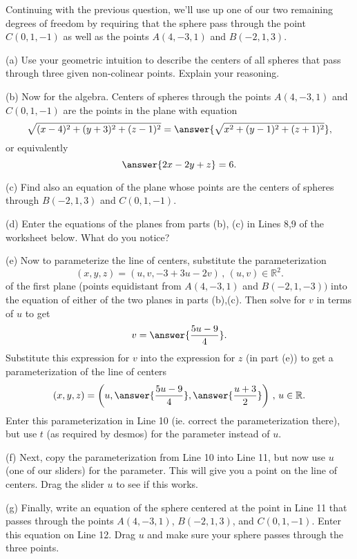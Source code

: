 \documentclass{ximera}
\begin{document}
\begin{question} \label{Q:LKdf44g44tr4}
Continuing with the previous question, we'll use up one of our two remaining degrees of freedom by requiring that the sphere pass through the point $C(0,1,-1)$ as well as the points $A(4,-3,1)$ and $B(-2,1,3)$.

\begin{freeResponse}
(a) Use your geometric intuition to describe the centers of all spheres that pass through three given non-colinear points. Explain your reasoning.
\end{freeResponse}

(b) Now for the algebra. Centers of spheres through the points $A(4,-3,1)$ and $C(0,1,-1)$ are the points in the plane with equation
\[
     \sqrt{(x-4)^2 + (y+3)^2 + (z-1)^2} = \answer{\sqrt{x^2 + (y-1)^2 + (z+1)^2}} ,
\]
or equivalently
\[
   \answer{2x -2y +z} = 6 .
\]

(c) Find also an equation of the plane whose points are the centers of spheres through $B(-2,1,3)$ and $C(0,1,-1)$.

(d) Enter the equations of the planes from parts (b), (c) in Lines 8,9 of the worksheet below. What do you notice?

(e) Now to parameterize the line of centers, substitute the parameterization 
\[
      (x,y,z) = (u,v,-3+3u-2v) \, , \, (u,v)\in \mathbb{R}^2 .
\]
of the first plane (points equidistant from $A(4,-3,1)$ and $B(-2,1,-3))$ into the equation of either of the two planes in parts (b),(c). Then solve for $v$ in terms of $u$ to get
\[
   v = \answer{\frac{5u-9}{4}} .
\]
Substitute this expression for $v$ into the expression for $z$ (in part (e)) to get a parameterization of the line of centers
\[
   (x,y,z) = \left( u, \answer{\frac{5u-9}{4}} , \answer{\frac{u+3}{2} }    \right) \, , \, u\in \mathbb{R} .
\]
Enter this parameterization in Line 10 (ie. correct the parameterization there), but use $t$ (as required by desmos) for the  parameter instead of $u$.

(f) Next, copy the parameterization from Line 10 into Line 11, but now use $u$ (one of our sliders) for the parameter. This will give you a point on the line of centers. Drag the slider $u$ to see if this works.

(g) Finally, write an equation of the sphere centered at the point in Line 11 that passes through the points $A(4,-3,1)$, $B(-2,1,3)$, and $C(0,1,-1)$. Enter this equation on Line 12. Drag $u$ and make sure your sphere passes through the three points.



\end{question}
\end{document}
